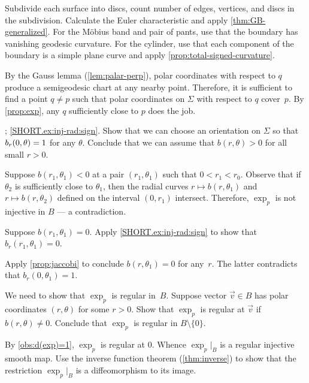 Subdivide each surface into discs,
count number of edges, vertices, and discs in the subdivision.
Calculate the Euler characteristic and apply \ref{thm:GB-generalized}.
For the Möbius band and pair of pants, use that the boundary has vanishing geodesic curvature.
For the cylinder, use that each component of the boundary is a simple plane curve and apply \ref{prop:total-signed-curvature}. 


\setcounter{eqtn}{0}

By the Gauss lemma (\ref{lem:palar-perp}), polar coordinates with respect to $q$ produce a semigeodesic chart at any nearby point.
Therefore, it is sufficient to find a point $q\ne p$ such that polar coordinates on $\Sigma$ with respect to $q$ cover~$p$.
By \ref{prop:exp}, any $q$ sufficiently close to $p$ does the job.

\parbf{\ref{ex:inj-rad}}; \ref{SHORT.ex:inj-rad:sign}.
Show that we can choose an orientation on $\Sigma$ so that $b_r(0,\theta)\z=1$ for any $\theta$.
Conclude that we can assume that $b(r,\theta)>0$ for all small $r>0$.

Suppose $b(r_1,\theta_1)<0$ at a pair $(r_1,\theta_1)$ such that $0<r_1<r_0$.
Observe that if $\theta_2$ is sufficiently close to $\theta_1$, then the radial curves $r\mapsto b(r,\theta_1)$ and $r\mapsto b(r,\theta_2)$ defined on the interval $(0,r_1)$ intersect.
Therefore, $\exp_p$ is not injective in $B$ --- a contradiction.

Suppose $b(r_1,\theta_1)=0$.
Apply \ref{SHORT.ex:inj-rad:sign} to show that $b_r(r_1,\theta_1)=0$.

Apply \ref{prop:jaccobi} to conclude $b(r,\theta_1)=0$ for any~$r$.
The latter contradicts that $b_r(0,\theta_1)=1$.

We need to show that $\exp_p$ is regular in~$B$.
Suppose vector $\vec v\in B$ has polar coordinates $(r,\theta)$ for some $r>0$.
Show that $\exp_p$ is regular at $\vec v$ if $b(r,\theta)\ne 0$.
Conclude that $\exp_p$ is regular in $B\setminus \{0\}$.

By \ref{obs:d(exp)=1}, $\exp_p$ is regular at $0$.
Whence $\exp_p|_B$ is a regular injective smooth map.
Use the inverse function theorem (\ref{thm:inverse}) to show that the restriction $\exp_p|_B$ is a diffeomorphism to its image. 
 



